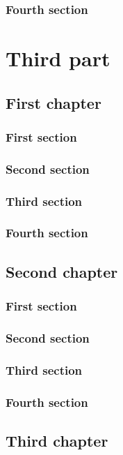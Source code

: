 \documentclass{researchbook}
\begin{document}
\section{Fourth section}\lipsum


\part{Third part}
\chapter{First chapter}

\section{First section}\lipsum
\section{Second section}\lipsum
\section{Third section}\lipsum
\section{Fourth section}\lipsum


\chapter{Second chapter}

\section{First section}\lipsum
\section{Second section}\lipsum
\section{Third section}\lipsum
\section{Fourth section}\lipsum


\chapter{Third chapter}
\end{document}
